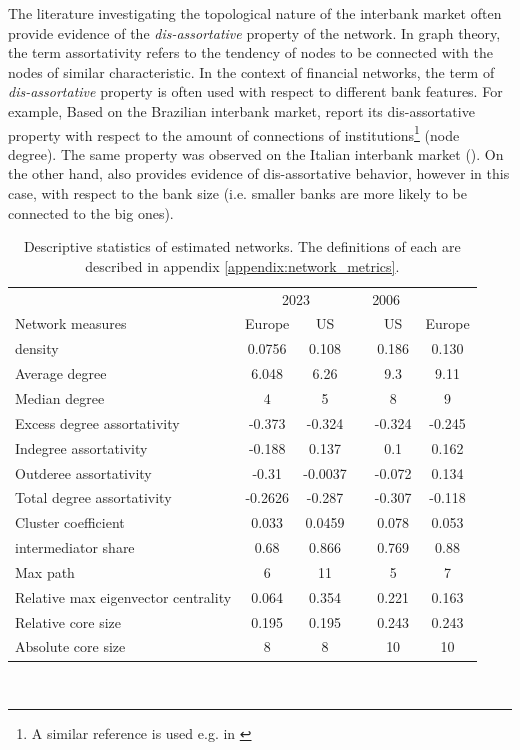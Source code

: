 \documentclass[12pt]{article}
\begin{document}
The literature investigating the topological nature of the interbank market often provide evidence of the \textit{dis-assortative} property of the network. In graph theory, the term assortativity refers to the tendency of nodes to be connected with the nodes of similar characteristic. In the context of financial networks, the term of \textit{dis-assortative} property is often used with respect to different bank features. For example, Based on the Brazilian interbank market, \cite{silva16} report its dis-assortative property with respect to the amount of connections of institutions\footnote{A similar reference is used e.g. in \cite{aldasoro17}} (node degree). The same property was observed on the Italian interbank market (\cite{bargigli15}). On the other hand, \cite{craig14} also provides evidence of dis-assortative behavior, however in this case, with respect to the bank size (i.e. smaller banks are more likely to be connected to the big ones).

\begin{table}
	\center
	\begin{tabular}{lcc c cc}
		\hline
		& \multicolumn{2}{c}{2023} & \multicolumn{2}{c}{2006}\\
		\cline{2-3} \cline{5-6} 
		\multicolumn{1}{l}{Network measures} & \multicolumn{1}{c}{Europe} & \multicolumn{1}{c}{US} && \multicolumn{1}{c}{US} & \multicolumn{1}{c}{Europe}\\
		\hline
		density & 0.0756 & 0.108 && 0.186 & 0.130 \\
		Average degree & 6.048 & 6.26 && 9.3 & 9.11 \\
		Median degree & 4 & 5 && 8 & 9 \\
		Excess degree assortativity & -0.373 & -0.324 && -0.324 & -0.245 \\
		Indegree assortativity & -0.188 & 0.137 && 0.1 & 0.162 \\
		Outderee assortativity & -0.31 & -0.0037 && -0.072 & 0.134 \\    
		Total degree assortativity & -0.2626 & -0.287 && -0.307 & -0.118 \\
		Cluster coefficient & 0.033 & 0.0459 && 0.078 & 0.053 \\
		intermediator share & 0.68 & 0.866 && 0.769 & 0.88 \\   
		Max path & 6 & 11 && 5 & 7 \\
		Relative max eigenvector centrality & 0.064 &  0.354 &&     0.221 & 0.163 \\
		Relative core size & 0.195 & 0.195 && 0.243 & 0.243 \\
		Absolute core size & 8 & 8 && 10 & 10 \\
		\hline
	\end{tabular}\
	\caption{Descriptive statistics of estimated networks. The definitions of each are described in appendix \ref{appendix:network_metrics}.}
	\label{table:network_metrics}
\end{table}
\end{document}
